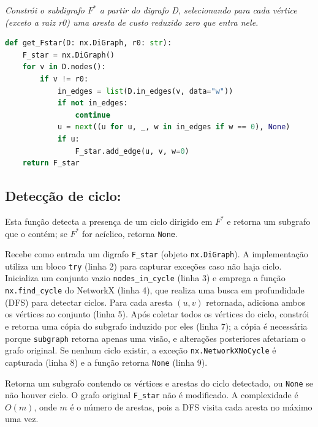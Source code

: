 \begin{tcolorbox}[
        enhanced, breakable,
        colframe=blue!60!black, colback=blue!2,
        colbacktitle=blue!15, coltitle=black,
        title={Construção de F star },
        boxed title style={sharp corners, boxrule=0.6pt},
        sharp corners, boxrule=0.6pt
    ]
    \emph{Constrói o subdigrafo $F^*$ a partir do digrafo D, selecionando para cada vértice (exceto a raiz r0) uma aresta de custo reduzido zero que entra nele.}
    \tcblower
    \begin{lstlisting}[mathescape=true, language=Python]
def get_Fstar(D: nx.DiGraph, r0: str):
    F_star = nx.DiGraph()
    for v in D.nodes():
        if v != r0:
            in_edges = list(D.in_edges(v, data="w"))
            if not in_edges:
                continue
            u = next((u for u, _, w in in_edges if w == 0), None)
            if u:
                F_star.add_edge(u, v, w=0)
    return F_star
\end{lstlisting}
\end{tcolorbox}

\subsection{Detecção de ciclo:}
Esta função detecta a presença de um ciclo dirigido em \(F^*\) e retorna um subgrafo que o contém; se \(F^*\) for acíclico, retorna \texttt{None}.

Recebe como entrada um digrafo \texttt{F\_star} (objeto \texttt{nx.DiGraph}). A implementação utiliza um bloco \texttt{try} (linha 2) para capturar exceções caso não haja ciclo. Inicializa um conjunto vazio \texttt{nodes\_in\_cycle} (linha 3) e emprega a função \texttt{nx.find\_cycle} do NetworkX (linha 4), que realiza uma busca em profundidade (DFS) para detectar ciclos. Para cada aresta \((u,v)\) retornada, adiciona ambos os vértices ao conjunto (linha 5). Após coletar todos os vértices do ciclo, constrói e retorna uma cópia do subgrafo induzido por eles (linha 7); a cópia é necessária porque \texttt{subgraph} retorna apenas uma visão, e alterações posteriores afetariam o grafo original. Se nenhum ciclo existir, a exceção \texttt{nx.NetworkXNoCycle} é capturada (linha 8) e a função retorna \texttt{None} (linha 9).

Retorna um subgrafo contendo os vértices e arestas do ciclo detectado, ou \texttt{None} se não houver ciclo. O grafo original \texttt{F\_star} não é modificado. A complexidade é \(O(m)\), onde \(m\) é o número de arestas, pois a DFS visita cada aresta no máximo uma vez.

